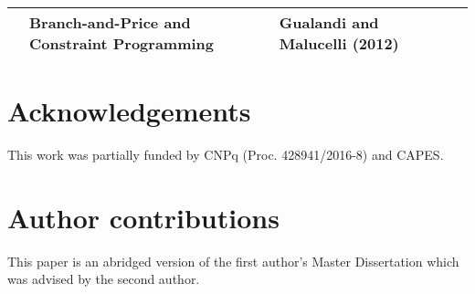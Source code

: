 \documentclass[fleqn,10pt]{SelfArx} %
\begin{document}
\begin{table*}[!htb]
\begin{tabular}{|p{2cm}|p{2cm}|p{2cm}|p{3.5cm}|p{2.1cm}|}
			& Branch-and-Price and Constraint Programming & Gualandi and Malucelli (2012)                       &                                                                                                                                                                                                                                                                                    &                                \\ \bottomrule
		\end{tabular}
		
	\end{table*}
    \pagebreak
	\section*{Acknowledgements}
	
	This work was partially funded by \textsf{CNPq} (Proc. 428941/2016-8) 
	and \textsf{CAPES}.
		
	\section*{Author contributions}
	
	This paper is an abridged version of the first author's Master Dissertation \cite{Lima17} which was advised by the second author.
	
	
	
	
	
	\makeatletter
	\renewcommand\@biblabel[1]{{\parbox{0.7cm}{[#1]}}}
	\makeatother
	\renewcommand{\refname}{References}
	
	
	
	
	
	
	\balance
\end{document}
